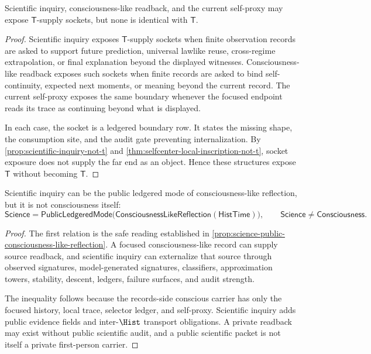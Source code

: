 \begin{theorem}
\label{thm:science-consciousness-i-expose-t-sockets-not-t}
Scientific inquiry, consciousness-like readback, and the current
self-proxy may expose $\mathsf{T}$-supply sockets, but none is identical
with $\mathsf{T}$.
\end{theorem}

\begin{proof}
Scientific inquiry exposes $\mathsf{T}$-supply sockets when finite
observation records are asked to support future prediction, universal
lawlike reuse, cross-regime extrapolation, or final explanation beyond
the displayed witnesses. Consciousness-like readback exposes such sockets
when finite records are asked to bind self-continuity, expected next
moments, or meaning beyond the current record. The current self-proxy
exposes the same boundary whenever the focused endpoint reads its trace
as continuing beyond what is displayed.

In each case, the socket is a ledgered boundary row. It states the
missing shape, the consumption site, and the audit gate preventing
internalization. By \autoref{prop:scientific-inquiry-not-t} and
\autoref{thm:selfcenter-local-inscription-not-t}, socket exposure does
not supply the far end as an object. Hence these structures expose
$\mathsf{T}$ without becoming $\mathsf{T}$.
\end{proof}

\begin{theorem}
\label{thm:public-science-local-consciousness-readback}
Scientific inquiry can be the public ledgered mode of
consciousness-like reflection, but it is not consciousness itself:
$$
\mathsf{Science}
=
\mathsf{PublicLedgeredMode}
\bigl(\mathsf{ConsciousnessLikeReflection}(\mathsf{HistTime})\bigr),
\qquad
\mathsf{Science}\neq\mathsf{Consciousness}.
$$
\end{theorem}

\begin{proof}
The first relation is the safe reading established in
\autoref{prop:science-public-consciousness-like-reflection}. A focused
consciousness-like record can supply source readback, and scientific
inquiry can externalize that source through observed signatures,
model-generated signatures, classifiers, approximation towers,
stability, descent, ledgers, failure surfaces, and audit strength.

The inequality follows because the records-side conscious carrier has
only the focused history, local trace, selector ledger, and self-proxy.
Scientific inquiry adds public evidence fields and inter-$\Hist$
transport obligations. A private readback may exist without public
scientific audit, and a public scientific packet is not itself a private
first-person carrier.
\end{proof}

